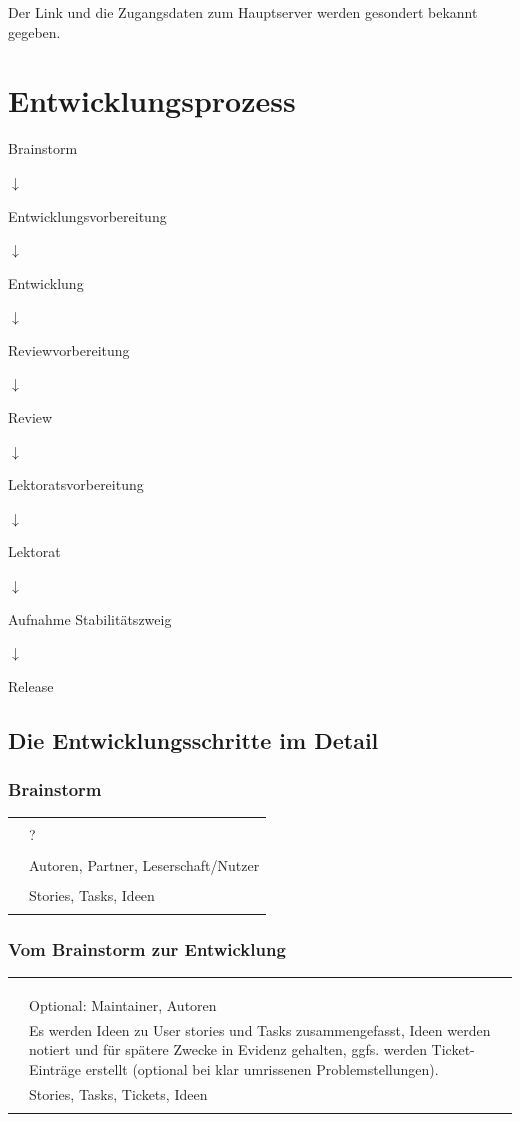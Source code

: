 \documentclass[
ngerman,
paper=a4,
asymmetric,
fontsize=10pt,
draft=false,
numbers=noenddot,
bibtotocnumbered,
footnotes=multiple,
toc=flat,
]{scrbook}
\newcommand{\Entwicklunsgprozessschritt}[8]
{
\noindent\begin{tabularx}{\linewidth}{lX}
\addlinespace\toprule\addlinespace
\multicolumn{2}{c}{Prozessschritt:
\TabHeading{\color{DefaultA}#1}}
\\\addlinespace\midrule\addlinespace \noindent\TabSub{Input} & #4
\\\addlinespace
\TabSub{Verantwortlicher} & #6
\\\addlinespace
\TabSub{Mitwirkende} & #7
\\\addlinespace
\TabSub{Tätigkeit} & #8
\\\addlinespace
\TabSub{Output} & #5
\\\addlinespace\bottomrule\addlinespace
\end{tabularx}
}
\begin{document}
Der Link und die Zugangsdaten zum Hauptserver werden gesondert bekannt gegeben.

\chapter{Entwicklungsprozess}


\begin{center}\sffamily
Brainstorm

$\downarrow$ 

Entwicklungsvorbereitung

$\downarrow$ 

Entwicklung

$\downarrow$ 

Reviewvorbereitung

$\downarrow$

Review

$\downarrow$ 

Lektoratsvorbereitung

$\downarrow$

Lektorat

$\downarrow$

Aufnahme Stabilitätszweig

$\downarrow$

Release
\end{center}

\bigskip


\section{Die Entwicklungsschritte im Detail}

\subsection{Brainstorm}

\Entwicklunsgprozessschritt
{%
Brainstorm}
{%
}
{%
}
{%
?}
{%
Stories, Tasks, Ideen}
{%
\T{Brainstormkoordinator}}
{%
Autoren, Partner, Leserschaft/Nutzer}
{%
}

\subsection{Vom Brainstorm zur Entwicklung}

\Entwicklunsgprozessschritt
{%
Entwicklungsvorbereitung}
{%
}
{%
}
{%
}
{%
Stories, Tasks, Tickets, Ideen}
{%
\T{Entwicklungskoordinator}}
{%
Optional: Maintainer, Autoren}
{%
Es werden Ideen zu User stories und Tasks zusammengefasst,
Ideen werden notiert und für spätere Zwecke in Evidenz
gehalten, ggfs. werden Ticket-Einträge erstellt (optional
bei klar umrissenen Problemstellungen).}
\end{document}
